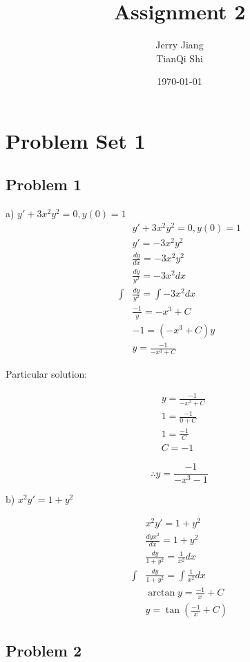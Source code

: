 \documentclass[titlepage]{article}
\title{Assignment 2}
\date{\today}
\author{Jerry Jiang\\ TianQi Shi}
\begin{document}
\maketitle

\noindent
\section{Problem Set 1}
\subsection{Problem 1}
a) $y' + 3x^2y^2 = 0, y(0) = 1$
\begin{align*}
  & y' + 3x^2y^2 = 0, y(0) = 1
  \\ & y' = -3x^2y^2
  \\ & \frac{dy}{dx} = -3x^2y^2
  \\ & \frac{dy}{y^2} = -3x^2 dx
  \\ \int & \frac{dy}{y^2} = \int -3x^2 dx
  \\ & \frac{-1}{y} = -x^3 + C
  \\ & -1 = (-x^3 + C)y
  \\ & y = \frac{-1}{-x^3 + C}
\end{align*}

Particular solution:

\begin{align*}
  & y = \frac{-1}{-x^3 + C}
  \\ & 1 = \frac{-1}{0 + C}
  \\ & 1 = \frac{-1}{C}
  \\ & C = -1
\end{align*}

$$\therefore y = \frac{-1}{-x^3 - 1}$$


\noindent
b) $x^2y' = 1 + y^2$

\begin{align*}
  & x^2y' = 1 + y^2
  \\ & \frac{dyx^2}{dx} = 1 + y^2
  \\ & \frac{dy}{1 + y^2} = \frac{1}{x^2} dx
  \\ \int & \frac{dy}{1 + y^2} = \int \frac{1}{x^2} dx
  \\ & \arctan y = \frac{-1}{x} + C
  \\ & y = \tan(\frac{-1}{x} + C) \end{align*}

\subsection{Problem 2}
\end{document}
